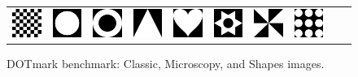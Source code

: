\documentclass[al, 27pt, plainboxedsections, landscape]{sciposter}
\begin{document}
\begin{multicols}{3}
\begin{figure}[!t]
{\begin{tabular}{cccccccccc}
  \includegraphics[width=0.095\linewidth]{images/shapes512_1003} & \includegraphics[width=0.095\linewidth]{images/shapes512_1004} &
  \includegraphics[width=0.095\linewidth]{images/shapes512_1005} &
  \includegraphics[width=0.095\linewidth]{images/shapes512_1006}  & \includegraphics[width=0.095\linewidth]{images/shapes512_1007} &
  \includegraphics[width=0.095\linewidth]{images/shapes512_1008} & \includegraphics[width=0.095\linewidth]{images/shapes512_1009} &
  \includegraphics[width=0.095\linewidth]{images/shapes512_1010} \\
 \end{tabular}}
\caption{DOTmark benchmark: Classic, Microscopy, and Shapes images. \label{fig:dot}}
\end{figure}


\end{multicols}
\end{document}
